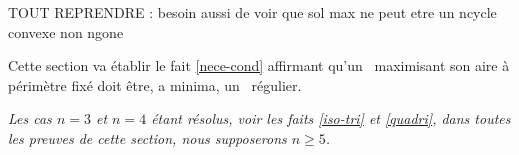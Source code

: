 TOUT REPRENDRE : besoin aussi de voir que sol max ne peut etre un ncycle convexe non ngone




Cette section va établir le fait \ref{nece-cond} affirmant qu'un \ngone\ maximisant son aire à périmètre fixé doit être, a minima, un \ngone\ régulier.


\begin{tcolorbox}
	\itshape\small
	Les cas $n = 3$ et $n = 4$ étant résolus, voir les faits \ref{iso-tri} et \ref{quadri}, dans toutes les preuves de cette section, nous supposerons $n \geq 5 $.
\end{tcolorbox}





%
%
%
%
%
%
%
%
%
%
%
%
%
%
%
%	
%
%
%
%
%
%
%
%
%
%
%			
%			
